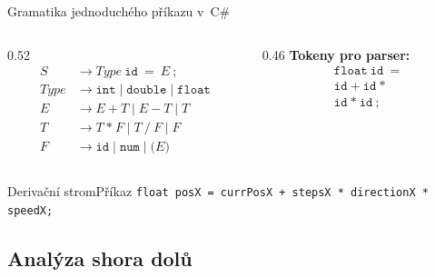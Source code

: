 \documentclass[11pt,professionalfont,aspectratio=43]{beamer}
\begin{document}
    \begin{frame}{Gramatika jednoduchého příkazu v~C\#}
        \begin{columns}[T,onlytextwidth]
            \begin{column}{0.52\textwidth}
                \[
                \begin{aligned}
                    S &\to \mathit{Type}\ \mathtt{id}\ \mathtt{=}\ E\ \mathtt{;} \\
                    \mathit{Type} &\to \mathtt{int} \mid \mathtt{double} \mid \mathtt{float} \\
                    E &\to E\ \mathtt{+}\ T \mid E\ \mathtt{-}\ T \mid T \\
                    T &\to T\ \mathtt{*}\ F \mid T\ \mathtt{/}\ F \mid F \\
                    F &\to \mathtt{id} \mid \mathtt{num} \mid \mathtt{(}E\mathtt{)}
                \end{aligned}
                \]
            \end{column}

            \begin{column}{0.46\textwidth}
                \textbf{Tokeny pro parser:}
                \[
                \begin{aligned}
                    &\mathtt{float}\ \mathtt{id}\ \mathtt{=}\\
                    &\mathtt{id}\ \mathtt{+}\ \mathtt{id}\ \mathtt{*}\\
                    &\mathtt{id}\ \mathtt{*}\ \mathtt{id}\ \mathtt{;}
                \end{aligned}
                \]
            \end{column}
        \end{columns}

    \end{frame}

    \begin{frame}{Derivační strom}{Příkaz \texttt{float posX = currPosX + stepsX * directionX * speedX;}}


    \end{frame}

    \subsection{Analýza shora dolů}
\end{document}
